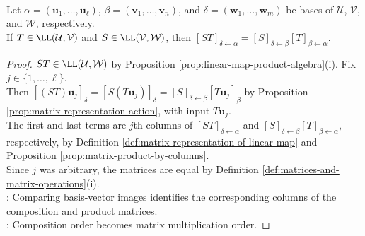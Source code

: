 \begin{proposition} \label{prop:composition-and-matrix-multiplication} \\
Let $\alpha=(\mathbf{u}_1,\ldots,\mathbf{u}_{\ell})$, $\beta=(\mathbf{v}_1,\ldots,\mathbf{v}_n)$, and $\delta=(\mathbf{w}_1,\ldots,\mathbf{w}_m)$ be bases of $\mathcal{U}$, $\mathcal{V}$, and $\mathcal{W}$, respectively.\\
If $T\in\LL(\mathcal{U},\mathcal{V})$ and $S\in\LL(\mathcal{V},\mathcal{W})$, then $[ST]_{\delta\leftarrow\alpha}=[S]_{\delta\leftarrow\beta}[T]_{\beta\leftarrow\alpha}$.
\begin{proof}
$ST\in\LL(\mathcal{U},\mathcal{W})$ by Proposition \ref{prop:linear-map-product-algebra}(i). Fix $j\in\{1,\ldots,\ell\}$.\\
Then $[(ST)\mathbf{u}_j]_{\delta}=[S(T\mathbf{u}_j)]_{\delta}=[S]_{\delta\leftarrow\beta}[T\mathbf{u}_j]_{\beta}$ by Proposition \ref{prop:matrix-representation-action}, with input $T\mathbf{u}_j$.\\
The first and last terms are $j$th columns of $[ST]_{\delta\leftarrow\alpha}$ and $[S]_{\delta\leftarrow\beta}[T]_{\beta\leftarrow\alpha}$, respectively, by Definition \ref{def:matrix-representation-of-linear-map} and Proposition \ref{prop:matrix-product-by-columns}.\\
Since $j$ was arbitrary, the matrices are equal by Definition \ref{def:matrices-and-matrix-operations}(i).\\
: Comparing basis-vector images identifies the corresponding columns of the composition and product matrices.\\
: Composition order becomes matrix multiplication order.
\end{proof}
\end{proposition}

